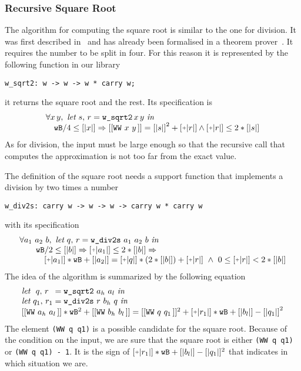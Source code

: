 \subsubsection{Recursive Square Root}

The algorithm for computing the square root is similar to the one for division.
It was first described in~\cite{RecSqrt} and has already been formalised in a 
theorem prover~\cite{BerMagZim02}. It requires the number to be split
in four. For this reason it is represented by the following function in our
library
\begin{verbatim}
w_sqrt2: w -> w -> w * carry w;
\end{verbatim}
it returns the square root and the rest.
Its specification is
$$\begin{array}{l}
\forall x\, y,\,\, \textit{let}\,\, s,\, r = \texttt{w\_sqrt2}\, x\, y\,\, \textit{in}\\
\hskip10pt \wB / 4 \le [|x|] \Rightarrow [[\WW x y]] = {[|s|]} ^ 2 + \ICP{r} \land \ICP{r} \le 2 * [|s|]
\end{array}
$$
As for division, the input must be large enough so that the recursive call
that computes the approximation is not too far from the exact value. 

The definition of the square root needs a support function that implements a division
by two times a number
\begin{verbatim}
w_div2s: carry w -> w -> w -> carry w * carry w
\end{verbatim}
with its specification
$$\begin{array}{l}
\forall a_1\,\, a_2\,\, b, \,\, \textit{let}\,\, q,\, r = \texttt{w\_div2s}\,\, a_1\,\, a_2\,\, b\,\, \textit{in}\\
\hskip20pt \wB / 2 \le [|b|] \Rightarrow \ICP{a_1} \le 2 * [|b|] \Rightarrow\\
\hskip30pt \ICP{a_1} * \wB + [|a_2|] = \ICP{q} *  (2 * [|b|]) + \ICP{r} \,\, \land\,\, 0 \le \ICP{r} < 2 * [|b|]
\end{array}
$$
The idea of the algorithm is summarized by the following equation
$$\begin{array}{l}
\textit{let}\,\,\,\, q ,\, r\,\,\, = \texttt{w\_sqrt2}\,\, {a_h}\,\, {a_l}\,\, \textit{in}\\
\textit{let}\,\, q_1 ,\, r_1 = \texttt{w\_div2s}\,\, r\,\, {b_h}\,\, q\,\, \textit{in}\\
{[[\WW {a_h} {a_l}]]} * \wB ^ 2 + [[\WW {b_h} {b_l}]] =
    [[\WW q {q_1}]] ^ 2 + \ICP{r_1} * \wB + [|{b_l}|] - {[|q_1|]} ^ 2 \\
\end{array}
$$
The element {\tt (WW q q1)} is a possible candidate
for the square root. Because of the condition on
the input, we are sure that the square root is either {\tt (WW q q1)} or
{\tt (WW q q1) - 1}. It is the sign of $\ICP{r_1} * \wB + 
[|{b_l}|] - [|q_1|] ^ 2$ that indicates in which situation we are. 